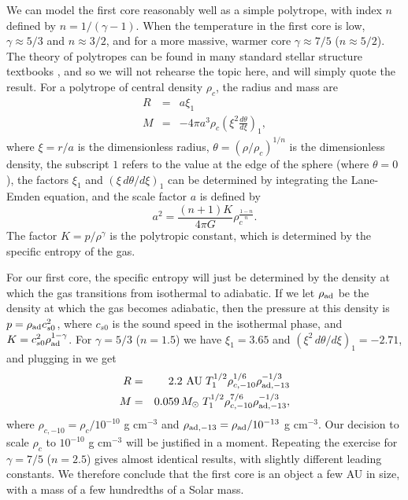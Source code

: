 We can model the first core reasonably well as a simple polytrope, with index $n$ defined by $n=1/(\gamma-1)$. When the temperature in the first core is low, $\gamma\approx 5/3$ and $n\approx 3/2$, and for a more massive, warmer core $\gamma \approx 7/5$ ($n\approx 5/2$). The theory of polytropes can be found in many standard stellar structure textbooks \citep[e.g.,][]{chandrasekhar39a, kippenhahn94a}, and so we will not rehearse the topic here, and will simply quote the result. For a polytrope of central density $\rho_c$, the radius and mass are
\begin{eqnarray}
R & = & a \xi_1\\
M & = & -4\pi a^3 \rho_c \left(\xi^2\frac{d\theta}{d\xi}\right)_1,
\end{eqnarray}
where $\xi=r/a$ is the dimensionless radius, $\theta = (\rho/\rho_c)^{1/n}$ is the dimensionless density, the subscript $1$ refers to the value at the edge of the sphere (where $\theta=0$), the factors $\xi_1$ and $(\xi\, d\theta/d\xi)_1$ can be determined by integrating the Lane-Emden equation, and the scale factor $a$ is defined by
\begin{equation}
a^2 = \frac{(n+1) K}{4\pi G} \rho_c^{\frac{1-n}{n}}.
\end{equation}
The factor $K = p/\rho^{\gamma}$ is the polytropic constant, which is determined by the specific entropy of the gas.

For our first core, the specific entropy will just be determined by the density at which the gas transitions from isothermal to adiabatic. If we let $\rho_{\rm ad}$ be the density at which the gas becomes adiabatic, then the pressure at this density is $p = \rho_{\rm ad} c_{s0}^2$, where $c_{s0}$ is the sound speed in the isothermal phase, and $K = c_{s0}^2 \rho_{\rm ad}^{1-\gamma}$. For $\gamma=5/3$ ($n=1.5$) we have $\xi_1=3.65$ and $(\xi^2\, d\theta/d\xi)_1=-2.71$, and plugging in we get
\begin{eqnarray}
R & = & 2.2\mbox{ AU} \; T_1^{1/2} \rho_{c,-10}^{1/6} \rho_{\rm ad,-13}^{-1/3} \\
M & = & 0.059\,M_{\odot}\; T_1^{1/2} \rho_{c,-10}^{7/6} \rho_{\rm ad,-13}^{-1/3},
\end{eqnarray}
where $\rho_{c,-10} = \rho_c / 10^{-10}$ g cm$^{-3}$ and $\rho_{\rm ad,-13} = \rho_{\rm ad}/10^{-13}$ g cm$^{-3}$. Our decision to scale $\rho_c$ to $10^{-10}$ g cm$^{-3}$ will be justified in a moment. Repeating the exercise for $\gamma=7/5$ ($n=2.5$) gives almost identical results, with slightly different leading constants. We therefore conclude that the first core is an object a few AU in size, with a mass of a few hundredths of a Solar mass.

